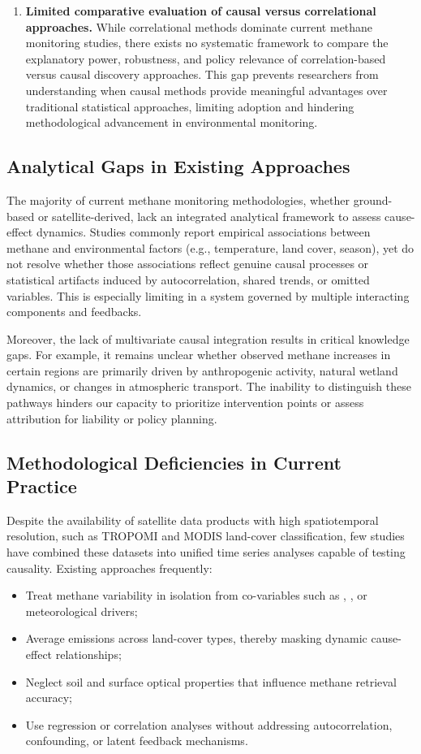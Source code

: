 \begin{enumerate}
	\item \textbf{Limited comparative evaluation of causal versus correlational approaches.}
	      While correlational methods dominate current methane monitoring studies, there exists no systematic framework to compare the explanatory power, robustness, and policy relevance of correlation-based versus causal discovery approaches. This gap prevents researchers from understanding when causal methods provide meaningful advantages over traditional statistical approaches, limiting adoption and hindering methodological advancement in environmental monitoring.
\end{enumerate}

\subsection{Analytical Gaps in Existing Approaches}

The majority of current methane monitoring methodologies, whether ground-based or satellite-derived, lack an integrated analytical framework to assess cause-effect dynamics. Studies commonly report empirical associations between methane and environmental factors (e.g., temperature, land cover, season), yet do not resolve whether those associations reflect genuine causal processes or statistical artifacts induced by autocorrelation, shared trends, or omitted variables. This is especially limiting in a system governed by multiple interacting components and feedbacks.

Moreover, the lack of multivariate causal integration results in critical knowledge gaps. For example, it remains unclear whether observed methane increases in certain regions are primarily driven by anthropogenic activity, natural wetland dynamics, or changes in atmospheric transport. The inability to distinguish these pathways hinders our capacity to prioritize intervention points or assess attribution for liability or policy planning.

\subsection{Methodological Deficiencies in Current Practice}

Despite the availability of satellite data products with high spatiotemporal resolution, such as TROPOMI  and MODIS land-cover classification, few studies have combined these datasets into unified time series analyses capable of testing causality. Existing approaches frequently:
\begin{itemize}
	\item Treat methane variability in isolation from co-variables such as , , or meteorological drivers;
	\item Average emissions across land-cover types, thereby masking dynamic cause-effect relationships;
	\item Neglect soil and surface optical properties that influence methane retrieval accuracy;
	\item Use regression or correlation analyses without addressing autocorrelation, confounding, or latent feedback mechanisms.
\end{itemize}

